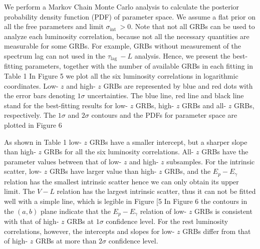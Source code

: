 We perform a Markov Chain Monte Carlo analysis to calculate the posterior probability density function (PDF) of parameter space. We assume a flat prior on all the free parameters and limit $\sigma_{\text {int }}>0$. Note that not all GRBs can be used to analyze each luminosity correlation, because not all the necessary quantities are measurable for some GRBs. For example, GRBs without measurement of the spectrum lag can not used in the $\tau_{\text {lag }}-L$ analysis. Hence, we present the best-fitting parameters, together with the number of available GRBs in each fitting in Table 1 In Figure 5 we plot all the six luminosity correlations in logarithmic coordinates. Low- $z$ and high- $z$ GRBs are represented by blue and red dots with the error bars denoting $1 \sigma$ uncertainties. The blue line, red line and black line stand for the best-fitting results for low- $z$ GRBs, high- $z$ GRBs and all- $z$ GRBs, respectively. The $1 \sigma$ and $2 \sigma$ contours and the PDFs for parameter space are plotted in Figure 6

As shown in Table 1 low- $z$ GRBs have a smaller intercept, but a sharper slope than high- $z$ GRBs for all the six luminosity correlations. All- $z$ GRBs have the parameter values between that of low- $z$ and high- $z$ subsamples. For the intrinsic scatter, low- $z$ GRBs have larger value than high- $z$ GRBs, and the $E_{p}-E_{\gamma}$ relation has the smallest intrinsic scatter hence we can only obtain its upper limit. The $V-L$ relation has the largest intrinsic scatter, thus it can not be fitted well with a simple line, which is legible in Figure [5 In Figure 6 the contours in the $(a, b)$ plane indicate that the $E_{p}-E_{\gamma}$ relation of low- $z$ GRBs is consistent with that of high- $z$ GRBs at $1 \sigma$ confidence level. For the rest luminosity correlations, however, the intercepts and slopes for low- $z$ GRBs differ from that of high- $z$ GRBs at more than $2 \sigma$ confidence level.